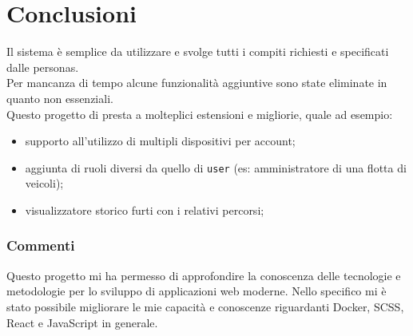 \documentclass{report}
\begin{document}
\section{Conclusioni}
Il sistema è semplice da utilizzare e svolge tutti i compiti richiesti e specificati dalle personas.\\ Per mancanza di tempo alcune funzionalità aggiuntive sono state eliminate in quanto non essenziali.\\Questo progetto di presta a molteplici estensioni e migliorie, quale ad esempio:
\begin{itemize}
    \item supporto all'utilizzo di multipli dispositivi per account;
    \item aggiunta di ruoli diversi da quello di \texttt{user} (es: amministratore di una flotta di veicoli);
    \item visualizzatore storico furti con i relativi percorsi;
\end{itemize}
\subsubsection{Commenti}
Questo progetto mi ha permesso di approfondire la conoscenza delle tecnologie e metodologie per lo sviluppo di applicazioni web moderne. Nello specifico mi è stato possibile migliorare le mie capacità e conoscenze riguardanti Docker, SCSS, React e JavaScript in generale.



\end{document}
